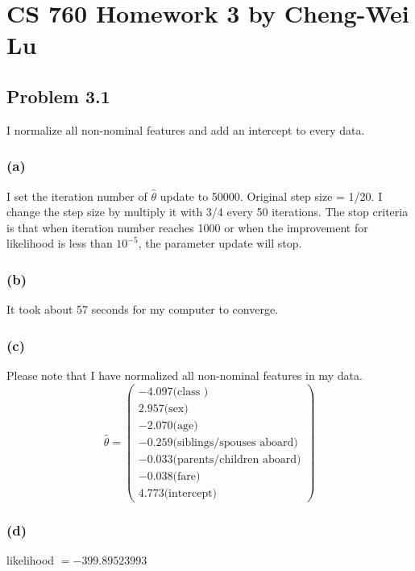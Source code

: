 \documentclass{article}
\begin{document}
\section*{CS 760 Homework 3 by Cheng-Wei Lu}

\subsection*{Problem 3.1}
I normalize all non-nominal features and add an intercept to every data.

\subsubsection*{(a)}
	I set the iteration number of $\hat{\theta}$ update to 50000. Original step size = 1/20. I change the step size by multiply it with 3/4 every 50 iterations. The stop criteria is that when iteration number reaches 1000 or when the improvement for likelihood is less than $10^{-5}$, the parameter update will stop.

\subsubsection*{(b)}
	It took about 57 seconds for my computer to converge.
\subsubsection*{(c)}
	Please note that I have normalized all non-nominal features in my data.
	\begin{equation*}
		\hat{\theta} =  \begin{pmatrix} -4.097\text{(class )}\\  2.957\text{(sex)}\\ -2.070\text{(age)}\\ -0.259\text{(siblings/spouses aboard)}\\-0.033\text{(parents/children aboard)}\\ -0.038\text{(fare)}\\4.773\text{(intercept)} \end{pmatrix} 	
		\end{equation*}
	
\subsubsection*{(d)}
	likelihood $ = -399.89523993 $
	
\end{document}
